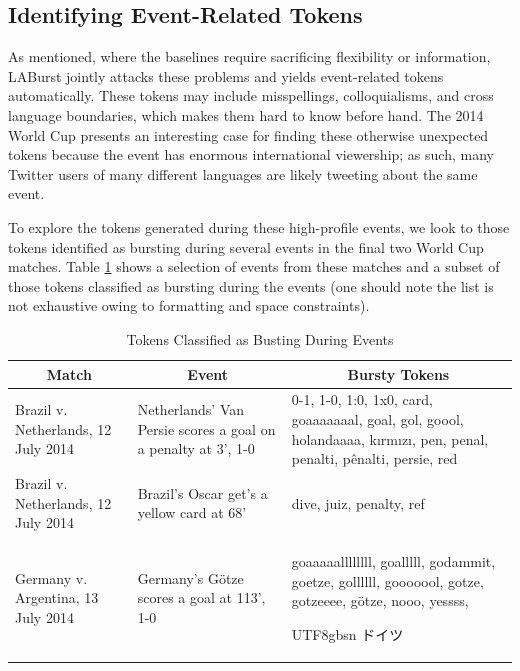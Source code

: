 \documentclass[letterpaper]{article}
\newcommand{\myfont}{gbsn}
\begin{document}
\subsection{Identifying Event-Related Tokens}

As mentioned, where the baselines require sacrificing flexibility or information, LABurst jointly attacks these problems and yields event-related tokens automatically.
These tokens may include misspellings, colloquialisms, and cross language boundaries, which makes them hard to know before hand.
The 2014 World Cup presents an interesting case for finding these otherwise unexpected tokens because the event has enormous international viewership; as such, many Twitter users of many different languages are likely tweeting about the same event.

To explore the tokens generated during these high-profile events, we look to those tokens identified as bursting during several events in the final two World Cup matches.
Table \ref{tab:burstyTokens} shows a selection of events from these matches and a subset of those tokens classified as bursting during the events (one should note the list is not exhaustive owing to formatting and space constraints).

\begin{table}[htdp]
\footnotesize
\caption{Tokens Classified as Busting During Events}
\begin{center}
\begin{tabular}{|p{0.75in}|p{0.7in}| p{1.45in} |}
\hline
\multicolumn{1}{|c|}{\textbf{Match}} & \multicolumn{1}{|c|}{\textbf{Event}} & \multicolumn{1}{|c|}{\textbf{Bursty Tokens}} \\ \hline
Brazil v. Netherlands, 12 July 2014 & Netherlands' Van Persie scores a goal on a penalty at 3', 1-0 & 0-1, 1-0, 1:0, 1x0, card, goaaaaaaal, goal, gol, goool, holandaaaa, k\i{}rm\i{}z\i{}, pen, penal, penalti, p\^{e}nalti, persie, red \\ \hline
Brazil v. Netherlands, 12 July 2014 & Brazil's Oscar get's a yellow card at 68' & dive, juiz, penalty, ref \\ \hline
Germany v. Argentina, 13 July 2014 & Germany's G\"{o}tze scores a goal at 113', 1-0 & goaaaaallllllll, goalllll, godammit, goetze, gollllll, gooooool, gotze, gotzeeee, g\"{o}tze, nooo, yessss, \begin{CJK}{UTF8}{\myfont} ドイツ\end{CJK} \\ \hline
\end{tabular}
\end{center}
\label{tab:burstyTokens}
\end{table}
\end{document}
